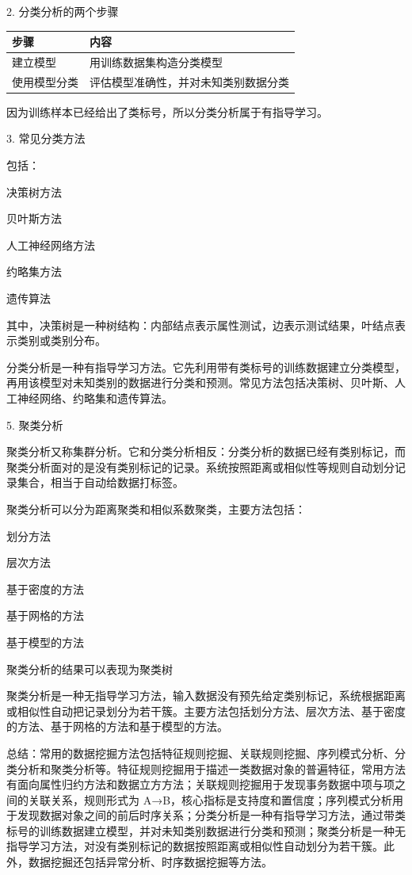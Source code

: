 \documentclass[UTF8,zihao=-4]{ctexart}
\begin{document}
2. 分类分析的两个步骤\par
\begin{tabularx}{\linewidth}{|*{2}{>{\RaggedRight\arraybackslash}X|}}
\hline
步骤 & 内容 \\
\hline
建立模型 & 用训练数据集构造分类模型 \\
\hline
使用模型分类 & 评估模型准确性，并对未知类别数据分类 \\
\hline
\end{tabularx}

因为训练样本已经给出了类标号，所以分类分析属于有指导学习。\par

3. 常见分类方法\par

包括：\par
决策树方法\par
贝叶斯方法\par
人工神经网络方法\par
约略集方法\par
遗传算法\par

其中，决策树是一种树结构：内部结点表示属性测试，边表示测试结果，叶结点表示类别或类别分布。\par

分类分析是一种有指导学习方法。它先利用带有类标号的训练数据建立分类模型，再用该模型对未知类别的数据进行分类和预测。常见方法包括决策树、贝叶斯、人工神经网络、约略集和遗传算法。\par

5. 聚类分析\par

聚类分析又称集群分析。它和分类分析相反：分类分析的数据已经有类别标记，而聚类分析面对的是没有类别标记的记录。系统按照距离或相似性等规则自动划分记录集合，相当于自动给数据打标签。\par

聚类分析可以分为距离聚类和相似系数聚类，主要方法包括：\par

划分方法\par
层次方法\par
基于密度的方法\par
基于网格的方法\par
基于模型的方法\par

聚类分析的结果可以表现为聚类树\par

聚类分析是一种无指导学习方法，输入数据没有预先给定类别标记，系统根据距离或相似性自动把记录划分为若干簇。主要方法包括划分方法、层次方法、基于密度的方法、基于网格的方法和基于模型的方法。\par

总结：常用的数据挖掘方法包括特征规则挖掘、关联规则挖掘、序列模式分析、分类分析和聚类分析等。特征规则挖掘用于描述一类数据对象的普遍特征，常用方法有面向属性归约方法和数据立方方法；关联规则挖掘用于发现事务数据中项与项之间的关联关系，规则形式为 A→B，核心指标是支持度和置信度；序列模式分析用于发现数据对象之间的前后时序关系；分类分析是一种有指导学习方法，通过带类标号的训练数据建立模型，并对未知类别数据进行分类和预测；聚类分析是一种无指导学习方法，对没有类别标记的数据按照距离或相似性自动划分为若干簇。此外，数据挖掘还包括异常分析、时序数据挖掘等方法。\par
\end{document}
